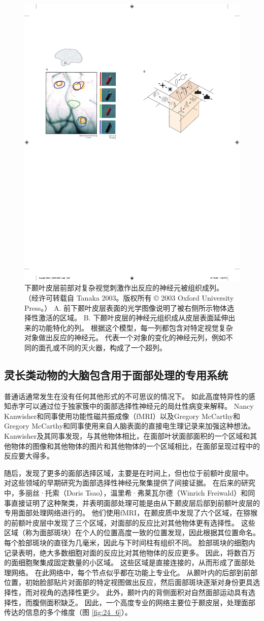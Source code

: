 \begin{figure}[htbp]
	\centering
	\includegraphics[width=0.5\linewidth]{chap24/fig_24_5}
	\caption{下颞叶皮层前部对复杂视觉刺激作出反应的神经元被组织成列。 （经许可转载自 Tanaka 2003。版权所有 © 2003 Oxford University Press。） A. 前下颞叶皮层表面的光学图像说明了被右侧所示物体选择性激活的区域。 B. 下颞叶皮层的神经元组织成从皮层表面延伸出来的功能特化的列。 根据这个模型，每一列都包含对特定视觉复杂对象做出反应的神经元。 代表一个对象的变化的神经元列，例如不同的面孔或不同的灭火器，构成了一个超列。}
	\label{fig:24_5}
\end{figure}


\subsection{灵长类动物的大脑包含用于面部处理的专用系统}
普通话通常发生在没有任何其他形式的不可思议的情况下。 
如此高度特异性的感知赤字可以通过位于独家簇中的面部选择性神经元的局灶性病变来解释。 
Nancy Kanwisher和同事使用功能性磁共振成像（fMRI）以及Gregory McCarthy和Gregory McCarthy和同事使用来自人脑表面的直接电生理记录来加强这种想法。 
Kanwisher及其同事发现，与其他物体相比，在面部叶状面部面积的一个区域和其他物体的图像和其他物体的图片和其他物体的一个区域相比，在面部呈现过程中的反应要大得多。


随后，发现了更多的面部选择区域，主要是在时间上，但也位于前额叶皮层中。 
对这些领域的早期研究为面部选择性神经元聚集提供了间接证据。
在后来的研究中，多丽丝·托索（Doris Tsao），温里希·弗莱瓦尔德（Winrich Freiwald）和同事直接证明了这种聚类，并表明面部处理可能是由从下颞皮层后部到前额叶皮层的专用面部处理网络进行的。
他们使用fMRI，在颞皮质中发现了六个区域，在猕猴的前额叶皮层中发现了三个区域，对面部的反应比对其他物体更有选择性。
这些区域（称为面部斑块）在个人的位置高度一致的位置发现，因此根据其位置命名。
每个脸部斑块的直径为几毫米，因此与下时间柱有组织不同。
脸部斑块的细胞内记录表明，绝大多数细胞对面的反应比对其他物体的反应更多。
因此，将数百万的面细胞聚集成固定数量的小区域。
这些区域是直接连接的，从而形成了面部处理网络。 
在此网络中，每个节点似乎都在功能上专业化。
从颞叶内的后部到前部位置，初始脸部贴片对面部的特定视图做出反应，然后面部斑块逐渐对身份更具选择性，而对视角的选择性更少。 
此外，颞叶内的背侧面积对自然面部运动具有选择性，而腹侧面积缺乏。 
因此，一个高度专业的网络主要位于颞皮层，处理面部传达的信息的多个维度（图 \ref{fig:24_6}）。


